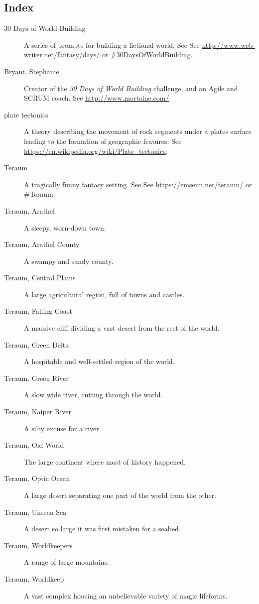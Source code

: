 \documentclass[11pt]{article}
\begin{document}
\subsection*{Index}
\label{sec:org75d290d}
\begin{description}
\item[{30 Days of World Building}] A series of prompts for building a fictional world. See See \href{http://www.web-writer.net/fantasy/days/}{http://www.web-writer.net/fantasy/days/} or \#30DaysOfWorldBuilding.
\item[{Bryant, Stephanie}] Creator of the \emph{30 Days of World Building} challenge, and an Agile and SCRUM coach. See \href{http://www.mortaine.com/}{http://www.mortaine.com/}
\item[{plate tectonics}] A theory describing the movement of rock segments under a plates surface leading to the formation of geographic features. See \href{https://en.wikipedia.org/wiki/Plate\_tectonics}{https://en.wikipedia.org/wiki/Plate\_tectonics}.
\item[{Teraum}] A tragically funny fantasy setting. See See \href{https://emsenn.net/teraum/}{https://emsenn.net/teraum/}  or \#Teraum.
\item[{Teraum, Arathel}] A sleepy, worn-down town.
\item[{Teraum, Arathel County}] A swampy and sandy county.
\item[{Teraum, Central Plains}] A large agricultural region, full of towns and castles.
\item[{Teraum, Falling Coast}] A massive cliff dividing a vast desert from the rest of the world.
\item[{Teraum, Green Delta}] A hospitable and well-settled region of the world.
\item[{Teraum, Green River}] A slow wide river, cutting through the world.
\item[{Teraum, Kaiper River}] A silty excuse for a river.
\item[{Teraum, Old World}] The large continent where most of history happened.
\item[{Teraum, Optic Ocean}] A large desert separating one part of the world from the other.
\item[{Teraum, Unseen Sea}] A desert so large it was first mistaken for a seabed.
\item[{Teraum, Worldkeepers}] A range of large mountains.
\item[{Teraum, Worldkeep}] A vast complex housing an unbelievable variety of magic lifeforms.
\end{description}
\end{document}
